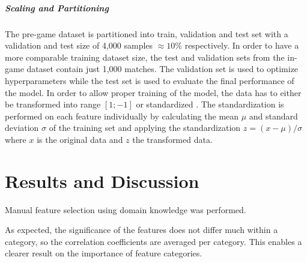 \documentclass[12pt, a4paper, headinclude, twoside, plainheadsepline, open=right, numbers=noenddot, hidelinks, toc=listof, toc=bibliography]{scrreprt}
\begin{document}
\paragraph{Scaling and Partitioning}
The pre-game dataset is partitioned into train, validation and test set with a validation and test size of 4,000 samples $ \approx 10\%$ respectively.
In order to have a more comparable training dataset size, the test and validation sets from the in-game dataset contain just 1,000 matches.
The validation set is used to optimize hyperparameters while the test set is used to evaluate the final performance of the model.
In order to allow proper training of the model, the data has to either be transformed into range $[1;-1]$ or standardized \cite{shankerEffectDataStandardization1996}.
The standardization is performed on each feature individually by calculating the mean $\mu$ and standard deviation $\sigma$ of the training set and applying the standardization $z = (x - \mu) / \sigma$ where $x$ is the original data and $z$ the transformed data.

\chapter{Results and Discussion}
\label{chap:results}

\label{sec:feature_selection_results}
Manual feature selection using domain knowledge was performed.

As expected, the significance of the features does not differ much within a category, so the correlation coefficients are averaged per category.
This enables a clearer result on the importance of feature categories.
\end{document}
